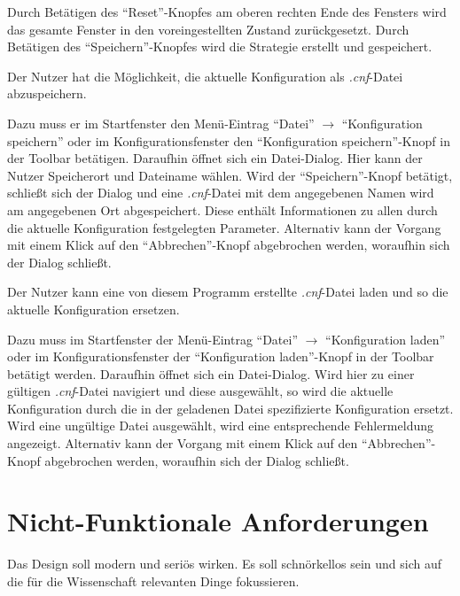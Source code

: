 \documentclass[parskip=full,11pt]{scrartcl}
\begin{document}
Durch Betätigen des \enquote{Reset}-Knopfes am oberen rechten Ende des Fensters wird das gesamte Fenster in den voreingestellten Zustand zurückgesetzt. Durch Betätigen des \enquote{Speichern}-Knopfes wird die Strategie erstellt und gespeichert.

Der Nutzer hat die Möglichkeit, die aktuelle Konfiguration als \textit{.cnf}-Datei abzuspeichern.

Dazu muss er im Startfenster den Menü-Eintrag \enquote{Datei} \(\rightarrow\) \enquote{Konfiguration speichern} oder im Konfigurationsfenster den \enquote{Konfiguration speichern}-Knopf in der Toolbar betätigen. Daraufhin öffnet sich ein Datei-Dialog. Hier kann der Nutzer Speicherort und Dateiname wählen. Wird der \enquote{Speichern}-Knopf betätigt, schließt sich der Dialog und eine \textit{.cnf}-Datei mit dem angegebenen Namen wird am angegebenen Ort abgespeichert. Diese enthält Informationen zu allen durch die aktuelle Konfiguration festgelegten Parameter. Alternativ kann der Vorgang mit einem Klick auf den \enquote{Abbrechen}-Knopf abgebrochen werden, woraufhin sich der Dialog schließt.

Der Nutzer kann eine von diesem Programm erstellte \textit{.cnf}-Datei laden und so die aktuelle Konfiguration ersetzen.

Dazu muss im Startfenster der Menü-Eintrag \enquote{Datei} \(\rightarrow\) \enquote{Konfiguration laden} oder im Konfigurationsfenster der \enquote{Konfiguration laden}-Knopf in der Toolbar betätigt werden. Daraufhin öffnet sich ein Datei-Dialog. Wird hier zu einer gültigen \textit{.cnf}-Datei navigiert und diese ausgewählt, so wird die aktuelle Konfiguration durch die in der geladenen Datei spezifizierte Konfiguration ersetzt. Wird eine ungültige Datei ausgewählt, wird eine entsprechende Fehlermeldung angezeigt. Alternativ kann der Vorgang mit einem Klick auf den \enquote{Abbrechen}-Knopf abgebrochen werden, woraufhin sich der Dialog schließt.

\section{Nicht-Funktionale Anforderungen}


Das Design soll modern und seriös wirken. Es soll schnörkellos sein und sich auf die für die Wissenschaft relevanten Dinge fokussieren.
\end{document}
